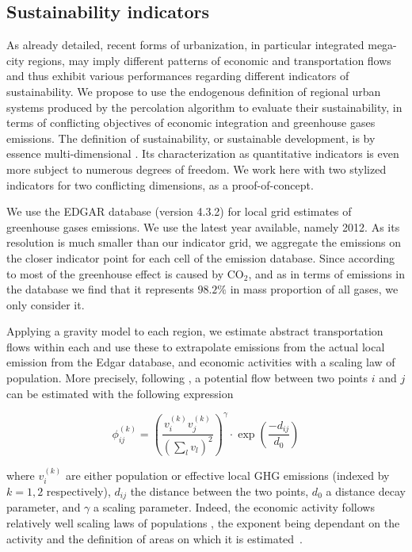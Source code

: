 \documentclass{jimis-en}
\begin{document}
\subsection{Sustainability indicators}


As already detailed, recent forms of urbanization, in particular integrated mega-city regions, may imply different patterns of economic and transportation flows and thus exhibit various performances regarding different indicators of sustainability. We propose to use the endogenous definition of regional urban systems produced by the percolation algorithm to evaluate their sustainability, in terms of conflicting objectives of economic integration and greenhouse gases emissions. The definition of sustainability, or sustainable development, is by essence multi-dimensional \citep{viguie2012trade}. Its characterization as quantitative indicators is even more subject to numerous degrees of freedom. We work here with two stylized indicators for two conflicting dimensions, as a proof-of-concept.


We use the EDGAR database \citep{janssens2017edgar} (version 4.3.2) for local grid estimates of greenhouse gases emissions. We use the latest year available, namely 2012. As its resolution is much smaller than our indicator grid, we aggregate the emissions on the closer indicator point for each cell of the emission database. Since according to \cite{lashof1990relative} most of the greenhouse effect is caused by $\textrm{CO}_2$, and as in terms of emissions in the database we find that it represents $98.2\%$ in mass proportion of all gases, we only consider it.

Applying a gravity model to each region, we estimate abstract transportation flows within each and use these to extrapolate emissions from the actual local emission from the Edgar database, and economic activities with a scaling law of population.  More precisely, following \cite{raimbault2018indirect}, a potential flow between two points $i$ and $j$ can be estimated with the following expression 

\begin{equation}
\phi_{ij}^{(k)} = \left(\frac{v^{(k)}_i v^{(k)}_j}{(\sum_l v_l)^2}\right)^\gamma \cdot \exp\left(\frac{-d_{ij}}{d_0}\right)
\end{equation}

where $v^{(k)}_i$ are either population or effective local GHG emissions (indexed by $k = 1,2$ respectively), $d_{ij}$ the distance between the two points, $d_0$ a distance decay parameter, and $\gamma$ a scaling parameter. Indeed, the economic activity follows relatively well scaling laws of populations \citep{bettencourt2007growth}, the exponent being dependant on the activity and the definition of areas on which it is estimated~\citep{cottineau2017diverse}.
\end{document}
